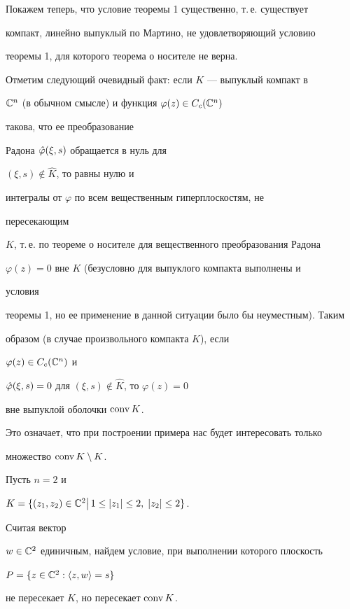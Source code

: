  


Покажем теперь, что условие теоремы 1 существенно, т.\,е. существует 


компакт, линейно выпуклый по Мартино, не удовлетворяющий условию 


теоремы 1, для которого теорема о носителе не верна. 


 


Отметим следующий очевидный факт: если $K$ --- выпуклый компакт в 


$\Bbb C^n$ (в обычном смысле) и функция $\varphi(z)\in C_c(\Bbb C^n)$ 


такова, что ее преобразование 


Радона $\Hat\varphi(\xi,s)$ обращается в нуль для 


$(\xi,s)\notin\widehat K$, то равны нулю и 


интегралы от $\varphi$ по всем вещественным гиперплоскостям, не 


пересекающим 


$K$, т.\,е. по теореме о носителе для вещественного преобразования Радона 


$\varphi(z)=0$ вне $K$ (безусловно для выпуклого компакта выполнены и 


условия 


теоремы 1, но ее применение в данной ситуации было бы неуместным). Таким 


образом (в случае произвольного компакта $K$), если 


$\varphi(z)\in C_c(\Bbb C^n)$ и 


$\Hat\varphi(\xi,s)=0$ для $(\xi,s)\notin\widehat K$, то $\varphi(z)=0$ 


вне выпуклой оболочки $\operatorname{conv} K$. 


Это означает, что при построении примера нас будет интересовать только 


множество $\operatorname{conv} K\setminus K$. 


 


Пусть $n=2$ и 


$K=\{(z_1,z_2)\in\Bbb C^2\bigl|\,\bigr.1\le|z_1|\le 2,\;|z_2|\le 2\}$. 


Считая вектор 


$w\in\Bbb C^2$ единичным, найдем условие, при выполнении которого плоскость 


$P=\{z\in\Bbb C^2:\langle z,w\rangle=s\}$


не пересекает $K$, но пересекает $\operatorname{conv} K$. 


